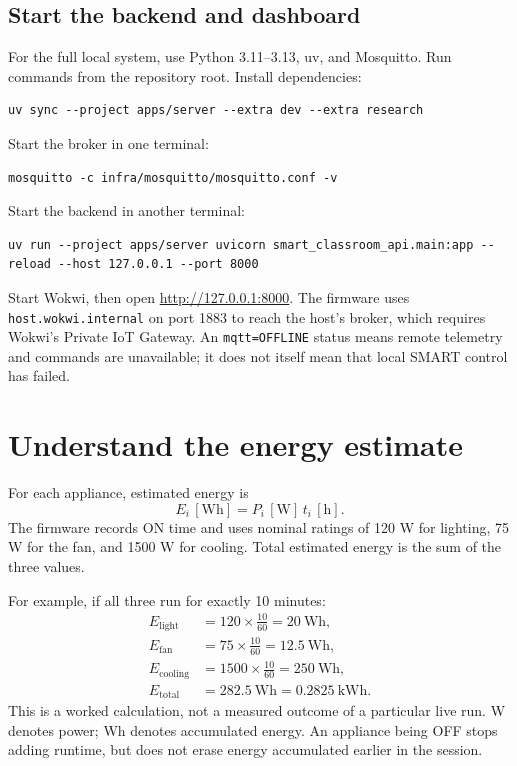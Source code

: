 \documentclass[11pt,a4paper]{article}
\begin{document}
\subsection{Start the backend and dashboard}
For the full local system, use Python 3.11--3.13, uv, and
Mosquitto. Run commands from the repository root. Install dependencies:
\begin{lstlisting}
uv sync --project apps/server --extra dev --extra research
\end{lstlisting}
Start the broker in one terminal:
\begin{lstlisting}
mosquitto -c infra/mosquitto/mosquitto.conf -v
\end{lstlisting}
Start the backend in another terminal:
\begin{lstlisting}
uv run --project apps/server uvicorn smart_classroom_api.main:app --reload --host 127.0.0.1 --port 8000
\end{lstlisting}
Start Wokwi, then open \url{http://127.0.0.1:8000}.
The firmware uses \nolinkurl{host.wokwi.internal} on port 1883 to reach the
host's broker, which requires Wokwi's Private IoT Gateway. An
\lstinline|mqtt=OFFLINE| status means remote telemetry and commands are
unavailable; it does not itself mean that local SMART control has failed.

\section{Understand the energy estimate}
\label{sec:energy}
For each appliance, estimated energy is
\[
 E_i\,[\mathrm{Wh}] =
 P_i\,[\mathrm{W}]\,t_i\,[\mathrm{h}].
\]
The firmware records ON time and uses nominal ratings of 120 W for
lighting, 75 W for the fan, and 1500 W for cooling. Total estimated
energy is the sum of the three values.

For example, if all three run for exactly 10 minutes:
\begin{align*}
E_{\mathrm{light}} &= 120 \times \frac{10}{60} = 20\ \mathrm{Wh},\\
E_{\mathrm{fan}} &= 75 \times \frac{10}{60} = 12.5\ \mathrm{Wh},\\
E_{\mathrm{cooling}} &= 1500 \times \frac{10}{60} = 250\ \mathrm{Wh},\\
E_{\mathrm{total}} &= 282.5\ \mathrm{Wh} = 0.2825\ \mathrm{kWh}.
\end{align*}
This is a worked calculation, not a measured outcome of a particular
live run. W denotes power; Wh denotes accumulated energy. An appliance
being OFF stops adding runtime, but does not erase energy accumulated
earlier in the session.
\end{document}
